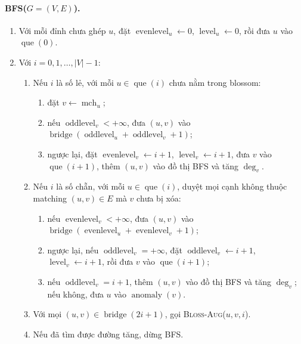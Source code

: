 \documentclass[11pt]{article}
\begin{document}
\paragraph{\textsc{BFS}(\(G=(V,E)\)).}
\begin{enumerate}
  \item Với mỗi đỉnh chưa ghép \(u\), đặt
  \(\operatorname{evenlevel}_u\leftarrow0\), \(\operatorname{level}_u\leftarrow0\),
  rồi đưa \(u\) vào \(\operatorname{que}(0)\).
  \item Với \(i=0,1,\ldots,|V|-1\):
  \begin{enumerate}
    \item Nếu \(i\) là số lẻ, với mỗi \(u\in\operatorname{que}(i)\) chưa nằm
    trong blossom:
    \begin{enumerate}
      \item đặt \(v\leftarrow\operatorname{mch}_u\);
      \item nếu \(\operatorname{oddlevel}_v<+\infty\), đưa \((u,v)\) vào
      \(\operatorname{bridge}(\operatorname{oddlevel}_u+\operatorname{oddlevel}_v+1)\);
      \item ngược lại, đặt
      \(\operatorname{evenlevel}_v\leftarrow i+1\),
      \(\operatorname{level}_v\leftarrow i+1\), đưa \(v\) vào
      \(\operatorname{que}(i+1)\), thêm \((u,v)\) vào đồ thị BFS và tăng
      \(\deg_v\).
    \end{enumerate}
    \item Nếu \(i\) là số chẵn, với mỗi \(u\in\operatorname{que}(i)\), duyệt
    mọi cạnh không thuộc matching \((u,v)\in E\) mà \(v\) chưa bị xóa:
    \begin{enumerate}
      \item nếu \(\operatorname{evenlevel}_v<+\infty\), đưa \((u,v)\) vào
      \(\operatorname{bridge}(\operatorname{evenlevel}_u+\operatorname{evenlevel}_v+1)\);
      \item ngược lại, nếu \(\operatorname{oddlevel}_v=+\infty\), đặt
      \(\operatorname{oddlevel}_v\leftarrow i+1\),
      \(\operatorname{level}_v\leftarrow i+1\), rồi đưa \(v\) vào
      \(\operatorname{que}(i+1)\);
      \item nếu \(\operatorname{oddlevel}_v=i+1\), thêm \((u,v)\) vào đồ thị
      BFS và tăng \(\deg_v\); nếu không, đưa \(u\) vào
      \(\operatorname{anomaly}(v)\).
    \end{enumerate}
    \item Với mọi \((u,v)\in\operatorname{bridge}(2i+1)\), gọi
    \textsc{Bloss-Aug}(\(u,v,i\)).
    \item Nếu đã tìm được đường tăng, dừng \textsc{BFS}.
  \end{enumerate}
\end{enumerate}
\end{document}
